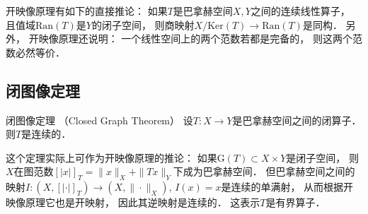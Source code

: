 开映像原理有如下的直接推论： 如果$T$是巴拿赫空间$X,Y$之间的连续线性算子， 且值域$\text{Ran}(T)$是$Y$的闭子空间， 则商映射$X/\text{Ker}(T)\to \text{Ran}(T)$是同构． 另外， 开映像原理还说明： 一个线性空间上的两个范数若都是完备的， 则这两个范数必然等价．

\subsection{闭图像定理}
\begin{theorem}{闭图像定理 （Closed Graph Theorem）}
设$T:X\to Y$是巴拿赫空间之间的闭算子． 则$T$是连续的．
\end{theorem}
这个定理实际上可作为开映像原理的推论： 如果$\text{G}(T)\subset X\times Y$是闭子空间， 则$X$在图范数$[|x|]_T=\|x\|_X+\|Tx\|_Y$下成为巴拿赫空间． 但巴拿赫空间之间的映射$I:(X,[|\cdot|]_T)\to(X,\|\cdot\|_X),\,I(x)=x$是连续的单满射， 从而根据开映像原理它也是开映射， 因此其逆映射是连续的． 这表示$T$是有界算子．
